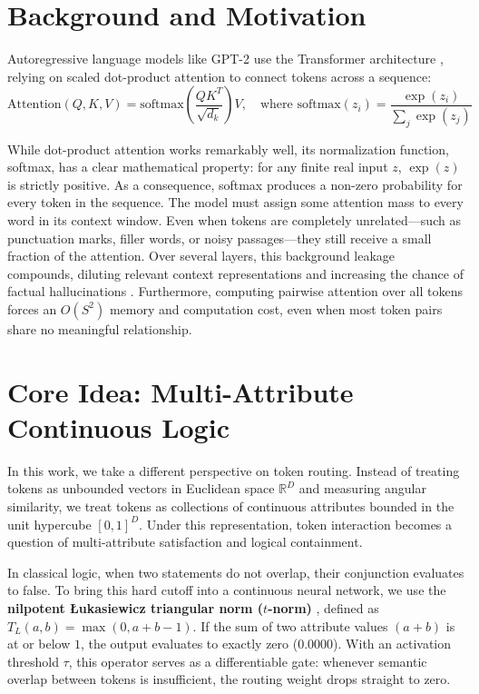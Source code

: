 \label{chap:introduction}

\section{Background and Motivation}
Autoregressive language models like GPT-2 use the Transformer architecture \cite{vaswani2017attention}, relying on scaled dot-product attention to connect tokens across a sequence:
\begin{equation}
\label{eq:standard_attention}
\text{Attention}(Q, K, V) = \text{softmax}\left(\frac{Q K^T}{\sqrt{d_k}}\right) V, \quad \text{where } \text{softmax}(z_i) = \frac{\exp(z_i)}{\sum_j \exp(z_j)}
\end{equation}

While dot-product attention works remarkably well, its normalization function, softmax, has a clear mathematical property: for any finite real input $z$, $\exp(z)$ is strictly positive. As a consequence, softmax produces a non-zero probability for every token in the sequence. The model must assign some attention mass to every word in its context window. Even when tokens are completely unrelated—such as punctuation marks, filler words, or noisy passages—they still receive a small fraction of the attention. Over several layers, this background leakage compounds, diluting relevant context representations and increasing the chance of factual hallucinations \cite{ji2023survey}. Furthermore, computing pairwise attention over all tokens forces an $O(S^2)$ memory and computation cost, even when most token pairs share no meaningful relationship.

\section{Core Idea: Multi-Attribute Continuous Logic}
In this work, we take a different perspective on token routing. Instead of treating tokens as unbounded vectors in Euclidean space $\mathbb{R}^D$ and measuring angular similarity, we treat tokens as collections of continuous attributes bounded in the unit hypercube $[0, 1]^D$. Under this representation, token interaction becomes a question of multi-attribute satisfaction and logical containment.

In classical logic, when two statements do not overlap, their conjunction evaluates to false. To bring this hard cutoff into a continuous neural network, we use the \textbf{nilpotent \L{}ukasiewicz triangular norm ($t$-norm)} \cite{klement2000triangular}, defined as $T_L(a, b) = \max(0, a + b - 1)$. If the sum of two attribute values $(a + b)$ is at or below $1$, the output evaluates to exactly zero ($0.0000$). With an activation threshold $\tau$, this operator serves as a differentiable gate: whenever semantic overlap between tokens is insufficient, the routing weight drops straight to zero.

